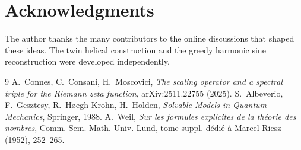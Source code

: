 \documentclass[11pt,a4paper]{article}
\begin{document}
\section*{Acknowledgments}
The author thanks the many contributors to the online discussions that shaped these ideas.  The twin helical construction and the greedy harmonic sine reconstruction were developed independently.

\begin{thebibliography}{9}
A.~Connes, C.~Consani, H.~Moscovici,
\emph{The scaling operator and a spectral triple for the Riemann zeta function},
arXiv:2511.22755 (2025).
S.~Albeverio, F.~Gesztesy, R.~H{\o}egh-Krohn, H.~Holden,
\emph{Solvable Models in Quantum Mechanics}, Springer, 1988.
A.~Weil,
\emph{Sur les formules explicites de la th\'eorie des nombres},
Comm. Sem. Math. Univ. Lund, tome suppl. d\'edi\'e \`a Marcel Riesz (1952), 252--265.
\end{thebibliography}
\end{document}
